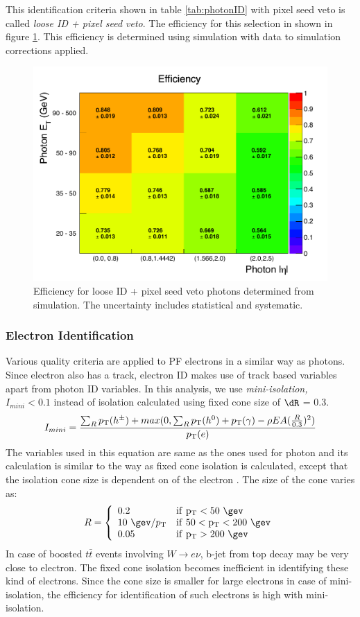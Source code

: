 This identification criteria shown in table \ref{tab:photonID} with pixel seed veto is called \textit{loose ID + pixel seed veto}. The efficiency for this selection in shown in figure \ref{fig:PhotonEfficiencies}. This efficiency is determined using simulation with data to simulation corrections applied.
\begin{figure}[h!]
\centering
\includegraphics[width=0.7\linewidth]{../Figures/Chap2/PhotonEfficiencies}
\captionsetup{width=.99\linewidth}
\caption[Loose + pixel seed veto photon efficiency]{Efficiency for loose ID + pixel seed veto photons determined from simulation. The uncertainty includes statistical and systematic.}
\label{fig:PhotonEfficiencies}
\end{figure}

\subsubsection{Electron Identification}
\label{sec:eleID}
Various quality criteria are applied to PF electrons in a similar way as photons. Since electron also has a track, electron ID makes use of track based variables apart from photon ID variables. In this analysis, we use \textit{mini-isolation, $I_{mini}<0.1$} instead of isolation calculated using fixed cone size of $\dR$ = 0.3.
\begin{equation}
I_{mini} = \frac{\sum_{R}^{}p_{\mathrm{T}} (h^\pm) + max(0,\sum_{R}^{}p_{\mathrm{T}}(h^0)+p_{\mathrm{T}}(\gamma) - \rho EA (\frac{R}{0.3})^2)}{p_{\mathrm{T}} (e)}
\end{equation}
The variables used in this equation are same as the ones used for photon and its calculation is similar to the way as fixed cone isolation is calculated, except that the isolation cone size is dependent on \pt of the electron \cite{Rehermann:2010vq}. The size of the cone varies as:
\[
R = \left\{
\begin{array}{ll}
0.2\ &\mathrm{if\ \pt < 50\ \gev}\\
10\ \gev /\pt &\mathrm{if\ 50 < \pt < 200\ \gev}\\
0.05 &\mathrm{if\ \pt > 200\ \gev}	
\end{array}
\right.
\]
In case of boosted $t\bar{t}$ events involving $W\to e\nu$, b-jet from top decay may be very close to electron. The fixed cone isolation becomes inefficient in identifying these kind of electrons. Since the cone size is smaller for large \pt electrons in case of mini-isolation, the efficiency for identification of such electrons is high with mini-isolation.

